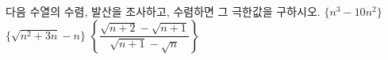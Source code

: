다음 수열의 수렴, 발산을 조사하고, 수렴하면 그 극한값을 구하시오.
 $\{n^3-10n^2\}$
 $\{\sqrt{n^2+3n}-n\}$
 $\left\{\dfrac{\sqrt{n+2}-\sqrt{n+1}}{\sqrt{n+1}-\sqrt{n}}\right\}$

